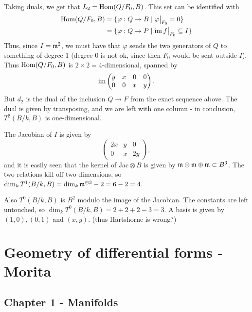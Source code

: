 \documentclass[11pt, english]{article}
\begin{document}
\begin{sol}
Taking duals, we get that $L_2 = \operatorname{Hom}(Q/F_0,B)$. This set can be identified with
\begin{align*}
\Hom(Q/F_0,B) &= \{ \varphi: Q \to B \mid \restr{\varphi}{F_0} = 0 \} \\
&= \{ \varphi: Q \to P \mid \im \restr{f}{F_0} \subseteq I \}
\end{align*}
Thus, since $I= \mathfrak{m}^2$, we must have that $\varphi$ sends the two generators of $Q$ to something of degree $1$ (degree $0$ is not ok, since then $F_0$ would be sent outside $I$). Thus $\operatorname{Hom}(Q/F_0,B)$ is $2 \times 2=4$-dimensional, spanned by 
\[
\operatorname{im} 
\begin{pmatrix}
  y & x & 0 & 0 \\
0 & 0 & x & y
\end{pmatrix}.
\]
But $d_2$ is the dual of the inclusion $Q \to F$ from the exact sequence above. The dual is given by transposing, and we are left with one column - in conclusion, $T^2(B/k,B)$ is one-dimensional.

The Jacobian of $I$ is given by
\[
\begin{pmatrix}
  2x & y & 0 \\
0 & x & 2y 
\end{pmatrix},
\]
and it is easily seen that the kernel of $\text{Jac} \otimes B$ is given by $\mathfrak{m} \oplus \mathfrak{m} \oplus \mathfrak{m} \subset B^3$. The two relations kill off two dimensions, so $\dim_k T^1(B/k,B) = \dim_k \mathfrak{m}^{\oplus 3} - 2 = 6-2=4$.

Also $T^0(B/k,B)$ is $B^2$ modulo the image of the Jacobian. The constants are left untouched, so $\dim_k T^0(B/k,B) = 2+2+2-3=3$. A basis is given by $(1,0),(0,1)$ and $(x,y)$. (thus Hartshorne is wrong?)
\end{sol}

\section{Geometry of differential forms - Morita}

\subsection{Chapter 1 - Manifolds}
\end{document}
